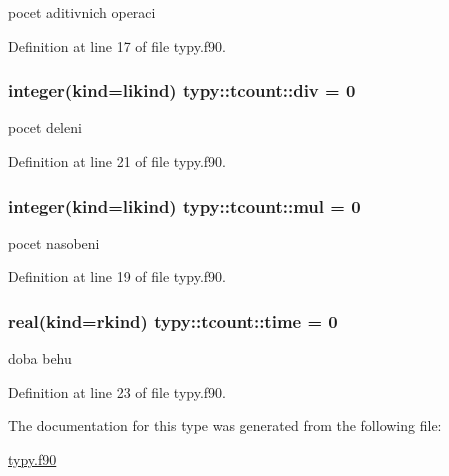 pocet aditivnich operaci 



\-Definition at line 17 of file typy.\-f90.

\hypertarget{structtypy_1_1tcount_a56f7ee9e379fb0657fc6729ae0e8eedc}{
\subsubsection[{div}]{\setlength{\rightskip}{0pt plus 5cm}integer(kind={\bf likind}) {\bf typy\-::tcount\-::div} = 0}}\label{structtypy_1_1tcount_a56f7ee9e379fb0657fc6729ae0e8eedc}


pocet deleni 



\-Definition at line 21 of file typy.\-f90.

\hypertarget{structtypy_1_1tcount_acb3e84ceaddd7603add14a6a634be6ed}{
\subsubsection[{mul}]{\setlength{\rightskip}{0pt plus 5cm}integer(kind={\bf likind}) {\bf typy\-::tcount\-::mul} = 0}}\label{structtypy_1_1tcount_acb3e84ceaddd7603add14a6a634be6ed}


pocet nasobeni 



\-Definition at line 19 of file typy.\-f90.

\hypertarget{structtypy_1_1tcount_a39ec51004274c0e7e2cd7142aa55cfcd}{
\subsubsection[{time}]{\setlength{\rightskip}{0pt plus 5cm}real(kind={\bf rkind}) {\bf typy\-::tcount\-::time} = 0}}\label{structtypy_1_1tcount_a39ec51004274c0e7e2cd7142aa55cfcd}


doba behu 



\-Definition at line 23 of file typy.\-f90.



\-The documentation for this type was generated from the following file\-:\begin{DoxyCompactItemize}
\item 
\hyperlink{typy_8f90}{typy.\-f90}\end{DoxyCompactItemize}
